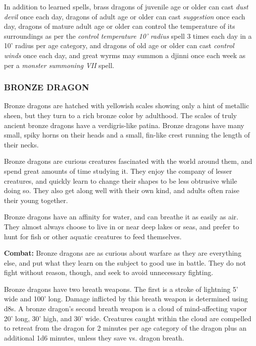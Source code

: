 \begin{multicols}{2}
In addition to learned spells, brass dragons of juvenile age or older can cast \textit{dust devil} once each day, dragons of adult age or older can cast \textit{suggestion} once each day, dragons of mature adult age or older can control the temperature of its surroundings as per the \textit{control temperature 10' radius} spell 3 times each day in a 10' radius per age category, and dragons of old age or older can cast \textit{control winds} once each day, and great wyrms may summon a djinni once each week as per a \textit{monster summoning VII} spell.

\subsubsection{BRONZE DRAGON}

Bronze dragons are hatched with yellowish scales showing only a hint of metallic sheen, but they turn to a rich bronze color by adulthood. The scales of truly ancient bronze dragons have a verdigris-like patina. Bronze dragons have many small, spiky horns on their heads and a small, fin-like crest running the length of their necks.

Bronze dragons are curious creatures fascinated with the world around them, and spend great amounts of time studying it. They enjoy the company of lesser creatures, and quickly learn to change their shapes to be less obtrusive while doing so. They also get along well with their own kind, and adults often raise their young together.

Bronze dragons have an affinity for water, and can breathe it as easily as air. They almost always choose to live in or near deep lakes or seas, and prefer to hunt for fish or other aquatic creatures to feed themselves.

\textbf{Combat:} Bronze dragons are as curious about warfare as they are everything else, and put what they learn on the subject to good use in battle. They do not fight without reason, though, and seek to avoid unnecessary fighting.

Bronze dragons have two breath weapons. The first is a stroke of lightning 5' wide and 100' long. Damage inflicted by this breath weapon is determined using d8s. A bronze dragon's second breath weapon is a cloud of mind-affecting vapor 20' long, 30' high, and 30' wide. Creatures caught within the cloud are compelled to retreat from the dragon for 2 minutes per age category of the dragon plus an additional 1d6 minutes, unless they save vs. dragon breath.


\end{multicols}
